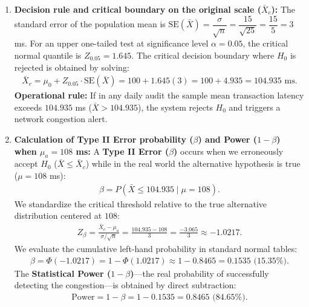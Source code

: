 \begin{solproblema}
	\begin{enumerate}
		\item \textbf{Decision rule and critical boundary on the original scale ($\bar{X}_c$):}
		The standard error of the population mean is $\text{SE}(\bar{X}) = \dfrac{\sigma}{\sqrt{n}} = \dfrac{15}{\sqrt{25}} = \dfrac{15}{5} = 3$ ms.
		For an upper one-tailed test at significance level $\alpha = 0.05$, the critical normal quantile is $Z_{0.05} = 1.645$.
		The critical decision boundary where $H_0$ is rejected is obtained by solving:
		\begin{align}
			\bar{X}_c = \mu_0 + Z_{0.05} \cdot \text{SE}(\bar{X}) = 100 + 1.645(3) = 100 + 4.935 = 104.935 \text{ ms.}
		\end{align}
		\textbf{Operational rule:} If in any daily audit the sample mean transaction latency exceeds $104.935$ ms ($\bar{X} > 104.935$), the system rejects $H_0$ and triggers a network congestion alert.
		
		\item \textbf{Calculation of Type II Error probability ($\beta$) and Power ($1-\beta$) when $\mu_a = 108$ ms:}
		A \textbf{Type II Error ($\beta$)} occurs when we erroneously accept $H_0$ ($\bar{X} \le \bar{X}_c$) while in the real world the alternative hypothesis is true ($\mu = 108$ ms):
		\begin{align}
			\beta = P\left(\bar{X} \le 104.935 \mid \mu = 108\right).
		\end{align}
		We standardize the critical threshold relative to the true alternative distribution centered at $108$:
		\begin{align}
			Z_\beta = \frac{\bar{X}_c - \mu_a}{\sigma/\sqrt{n}} = \frac{104.935 - 108}{3} = \frac{-3.065}{3} \approx -1.0217.
		\end{align}
		We evaluate the cumulative left-hand probability in standard normal tables:
		\begin{align}
			\beta = \Phi(-1.0217) = 1 - \Phi(1.0217) \approx 1 - 0.8465 = 0.1535 \text{ (15.35\%).}
		\end{align}
		The \textbf{Statistical Power ($1-\beta$)}—the real probability of successfully detecting the congestion—is obtained by direct subtraction:
		\begin{align}
			\text{Power} = 1 - \beta = 1 - 0.1535 = 0.8465 \text{ (84.65\%).}
		\end{align}
		

\end{enumerate}
\end{solproblema}
